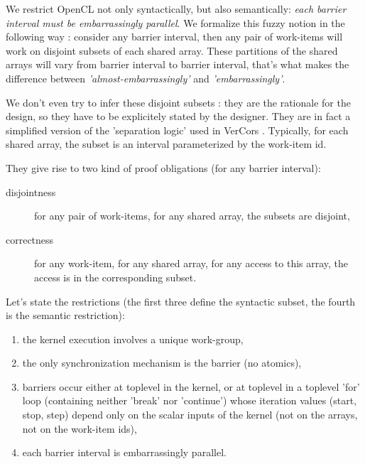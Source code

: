\documentclass[a4paper,10pt]{article} %
\begin{document}
We restrict OpenCL not only syntactically, but also semantically: \emph{each barrier interval must be embarrassingly parallel}. We formalize this fuzzy notion in the following way : consider any barrier interval, then any pair of work-items will work on disjoint subsets of each shared array.
These partitions of the shared arrays will vary from barrier interval to barrier interval, that's what makes the difference between \emph{'almost-embarrassingly'} and \emph{'embarrassingly'}.

We don't even try to infer these disjoint subsets : they are the rationale for the design, so they have to be explicitely stated by the designer.
They are in fact a simplified version of the 'separation logic' used in VerCors  \cite{blom2014vercors}.
Typically, for each shared array,  the subset is an interval parameterized by the work-item id.

They give rise to two kind of proof obligations (for any barrier interval):
\begin{description}
\item[disjointness]  for any pair of work-items, for any shared array, the subsets are disjoint,
\item[correctness] for any  work-item, for any shared array, for any access to this array, the access is in the corresponding subset.
\end{description}

Let's state the restrictions (the first three define the syntactic subset, the fourth is the semantic restriction):
\begin{enumerate}
\item the kernel execution involves a unique work-group,
\item the only synchronization mechanism is the barrier (no atomics),
\item barriers occur either at toplevel in the kernel, or at toplevel in a toplevel 'for' loop (containing neither 'break' nor 'continue') whose iteration values (start, stop, step) depend only on the scalar inputs of the kernel (not on the arrays, not on the work-item ids),
\item each barrier interval is embarrassingly parallel.
\end{enumerate}

\begin{comment}


\begin{quotation}
Note that the work-group barrier must be encountered by all workitems of a work-group executing the kernel or by none at all.
\end{quotation}


synchronization : host and device (wi, kernel)
work-item synchronization is not necessary in case of embarassingly parallel
applies only to work-items in the same work-group

\end{comment}
\end{document}
